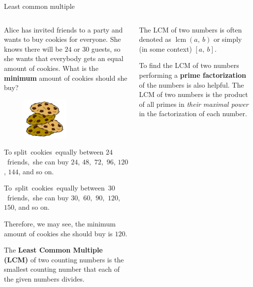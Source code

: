 \documentclass[9pt,aspectratio=169]{beamer}
\DeclareMathOperator{\lcm}{lcm}
\begin{document}
\begin{frame}{Least common multiple}
  \begin{columns}[T]
    \begin{column}{0.5\textwidth}
      \begin{problem}
        Alice has invited friends to a party and wants to buy cookies for everyone. She knows there will be $24$ or $30$ guests, so she wants that everybody gets an equal amount of cookies. What is the \textbf{minimum} amount of cookies should she buy?
      \end{problem}
      \begin{figure}
        \vspace*{-2em}\hspace*{-3em}
        \includegraphics[width=0.5\textwidth]{04 - Number Theory 101/coockies.png}
      \end{figure}

      To split~cookies~equally between $24$~friends,~she can buy $24$, $48$,~$72$,~$96$, $120$, $144$, and so on. 

      To~split~cookies~equally between~$30$~friends,~she can buy $30$,~$60$,~$90$,~$120$, $150$, and so on. 
      
      Therefore, we may see, the minimum amount of cookies she should buy is $120$.

      \begin{definition}
        The \textbf{Least Common Multiple (LCM)} of two counting numbers is the smallest counting number that each of the given numbers divides.  
      \end{definition}
    \end{column}
    \begin{column}{0.5\textwidth}
      The LCM of two numbers is often denoted as $\lcm(a,\ b)$ or simply (in some context) $[a,\ b]$. 

      To find the LCM of two numbers performing a \textbf{prime factorization} of the numbers is also helpful. The LCM of two numbers is the product of all primes in \emph{their maximal power} in the factorization of each number.
      

\end{column}
\end{columns}
\end{frame}
\end{document}
